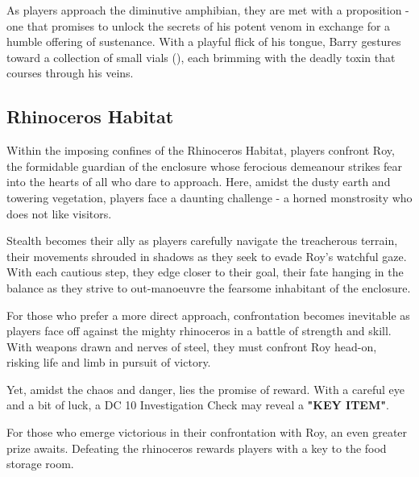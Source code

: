 As players approach the diminutive amphibian, they are met with a proposition - one that promises to unlock the secrets of his potent venom in exchange for a humble offering of sustenance. With a playful flick of his tongue, Barry gestures toward a collection of small vials (), each brimming with the deadly toxin that courses through his veins.
\subsection*{ Rhinoceros Habitat}
Within the imposing confines of the Rhinoceros Habitat, players confront Roy, the formidable guardian of the enclosure whose ferocious demeanour strikes fear into the hearts of all who dare to approach. Here, amidst the dusty earth and towering vegetation, players face a daunting challenge - a horned monstrosity who does not like visitors.

Stealth becomes their ally as players carefully navigate the treacherous terrain, their movements shrouded in shadows as they seek to evade Roy's watchful gaze. With each cautious step, they edge closer to their goal, their fate hanging in the balance as they strive to out-manoeuvre the fearsome inhabitant of the enclosure.

For those who prefer a more direct approach, confrontation becomes inevitable as players face off against the mighty rhinoceros in a battle of strength and skill. With weapons drawn and nerves of steel, they must confront Roy head-on, risking life and limb in pursuit of victory.

Yet, amidst the chaos and danger, lies the promise of reward. With a careful eye and a bit of luck, a DC 10 Investigation Check may reveal a \textbf{"KEY ITEM"}.

For those who emerge victorious in their confrontation with Roy, an even greater prize awaits. Defeating the rhinoceros rewards players with a key to the food storage room.

